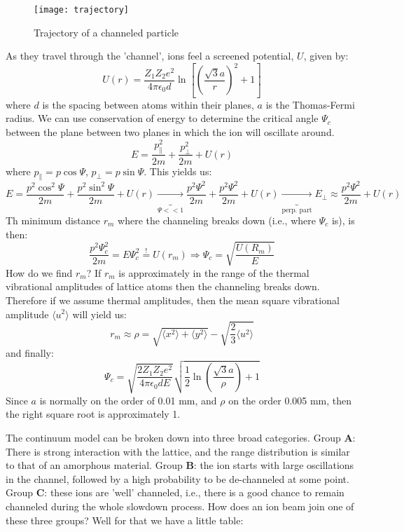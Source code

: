 \begin{figure}
	\centering
	\texttt{[image: trajectory]}
	\caption{Trajectory of a channeled particle}
	\label{fig:trajec}
\end{figure}
As they travel through the 'channel', ions feel a screened potential, $U$,  given by:
$$U(r) = \frac{Z_1 Z_2 e^2}{4\pi\epsilon_0 d} \ln \left[ \left( \frac{\sqrt{3}a}{r}\right)^2 + 1\right]$$
where $d$ is the spacing between atoms within their planes, $a$ is the Thomas-Fermi radius.
We can use conservation of energy to determine the critical angle $\Psi_c$ between the plane between two planes in which the ion will oscillate around.
$$ E = \frac{p_{\parallel} ^2}{2m} + \frac{p_{\perp} ^2}{2m}  + U(r)$$
where $p_\parallel = p\cos\Psi$, $p_\perp = p\sin\Psi$.
This yields us:
$$ E = \frac{p^2 \cos^2 \Psi}{2m} + \frac{p^2 \sin^2 \Psi}{2m} + U(r)  \underbrace{\rightarrow}_{\Psi << 1} \frac{p^2 \Psi^2}{2m} +  \frac{p^2 \Psi^2}{2m} + U(r) \underbrace{\rightarrow}_{\textrm{perp. part}}  E_\perp \approx \frac{p^2\Psi^2}{2m} + U(r) $$
Th minimum distance $r_m$ where the channeling breaks down (i.e., where $\Psi_c$ is), is then:
$$ \frac{p^2\Psi_c^2}{2m} = E\Psi_c^2  \overset{!}{=} U(r_m) \Rightarrow \Psi_c = \sqrt{\frac{U(R_m)}{E}}$$
How do we find $r_m$? If $r_m$ is approximately in the range of the thermal vibrational amplitudes of lattice atoms then the channeling breaks down.
Therefore if we assume  thermal amplitudes, then the mean square vibrational amplitude $\langle u^2 \rangle$ will yield us:
$$r_m \approx \rho = \sqrt{\langle x^2 \rangle + \langle y^2 \rangle} - \sqrt{ \frac{2}{3} \langle u^2 \rangle} $$
and finally:
$$\Psi_c = \sqrt{\frac{2Z_1 Z_2 e^2}{4\pi \epsilon_0 d E}} \sqrt{\frac{1}{2} \ln \left( \frac{\sqrt{3} a}{\rho}\right) + 1}$$
Since $a$ is normally on the order of 0.01 mm, and $\rho$ on the order 0.005 mm, then the right square root is approximately 1.

The continuum model can be broken down into three broad categories.
Group \textbf{A}: There is strong interaction with the lattice, and the range distribution is similar to that of an amorphous material.
Group \textbf{B}: the ion starts with large oscillations in the channel, followed by a high probability to be de-channeled at some point.
Group \textbf{C}: these ions are 'well' channeled, i.e., there is a good chance to remain channeled during the whole slowdown process.
How does an ion beam join one of these three groups?
Well for that we have a little table:

